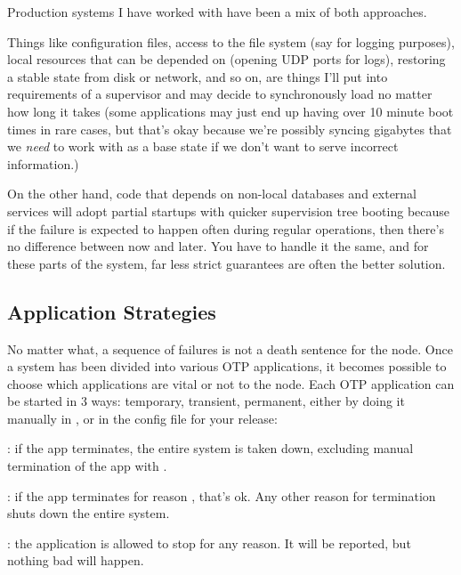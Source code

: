 Production systems I have worked with have been a mix of both approaches.

Things like configuration files, access to the file system (say for logging purposes), local resources that can be depended on (opening UDP ports for logs), restoring a stable state from disk or network, and so on, are things I'll put into requirements of a supervisor and may decide to synchronously load no matter how long it takes (some applications may just end up having over 10 minute boot times in rare cases, but that's okay because we're possibly syncing gigabytes that we \emph{need} to work with as a base state if we don't want to serve incorrect information.)

On the other hand, code that depends on non-local databases and external services will adopt partial startups with quicker supervision tree booting because if the failure is expected to happen often during regular operations,
then there's no difference between now and later. You have to handle it the same, and for these parts of the system, far less strict guarantees are often the better solution.

\subsection{Application Strategies}
\label{subsec:start-link-application-strategies}

No matter what, a sequence of failures is not a death sentence for the node. Once a system has been divided into various OTP applications, it becomes possible to choose which applications are vital or not to the node. Each OTP application can be started in 3 ways: temporary, transient, permanent, either by doing it manually in , or in the config file for your release:

\begin{itemize*}
	\item {}: if the app terminates, the entire system is taken down, excluding manual termination of the app with .
	\item {}: if the app terminates for reason , that's ok. Any other reason for termination shuts down the entire system.
	\item {}: the application is allowed to stop for any reason. It will be reported, but nothing bad will happen.
\end{itemize*}

